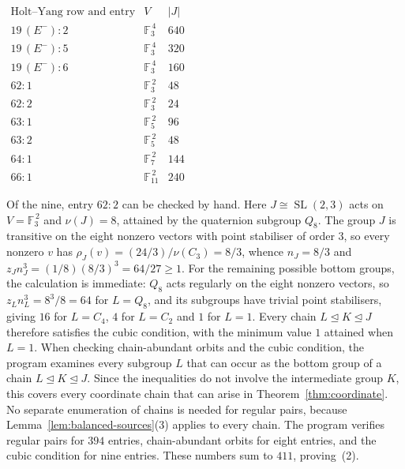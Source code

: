 \documentclass[10pt]{amsart}
\theoremstyle{definition}
\renewcommand{\ge}{\geqslant}
\let\oldendproof\endproof
\renewenvironment{proof}[1][\proofname]{%
  \oldproof[\bfseries #1]%
}{\oldendproof}
\DeclareMathOperator{\SL}{SL}
\numberwithin{equation}{section}
\numberwithin{table}{section}
\begin{document}
\begin{proof}
\begin{sloppypar}
\end{sloppypar}
\begin{table}[H]
\caption{Residual actions for which the cubic condition is used.}
\label{tab:cubic-actions}
\centering
$
\renewcommand{\arraystretch}{1.15}
\begin{array}{c|c|c}
 \text{Holt--Yang row and entry} & V & |J|\\\hline
 19\,(E^{-}):2 & \mathbb{F}_3^{\,4} & 640\\
 19\,(E^{-}):5 & \mathbb{F}_3^{\,4} & 320\\
 19\,(E^{-}):6 & \mathbb{F}_3^{\,4} & 160\\
 62:1 & \mathbb{F}_3^{\,2} & 48\\
 62:2 & \mathbb{F}_3^{\,2} & 24\\
 63:1 & \mathbb{F}_5^{\,2} & 96\\
 63:2 & \mathbb{F}_5^{\,2} & 48\\
 64:1 & \mathbb{F}_7^{\,2} & 144\\
 66:1 & \mathbb{F}_{11}^{\,2} & 240
\end{array}
$
\end{table}
Of the nine, entry $62:2$ can be checked by hand. Here
$J\cong\SL(2,3)$ acts on $V=\mathbb{F}_3^{\,2}$ and
$\nu(J)=8$, attained by the quaternion subgroup $Q_8$. The group $J$ is
transitive on the eight nonzero vectors with point stabiliser of order $3$,
so every nonzero $v$ has $\rho_J(v)=(24/3)/\nu(C_3)=8/3$, whence $n_J=8/3$
and $z_Jn_J^{3}=(1/8)(8/3)^{3}=64/27\ge1$. For the remaining possible bottom
groups, the calculation is immediate:
$Q_8$ acts regularly on the eight nonzero vectors, so $z_Ln_L^{3}=8^{3}/8=64$ for
$L=Q_8$, and its subgroups have trivial point stabilisers, giving $16$ for $L=C_4$, $4$ for
$L=C_2$ and $1$ for $L=1$. Every chain $L\trianglelefteq K\trianglelefteq J$
therefore satisfies the cubic condition, with the minimum value $1$ attained
when $L=1$.
When checking chain-abundant orbits and the cubic condition, the program
examines every subgroup $L$ that can occur as the bottom group of a chain
$L\trianglelefteq K\trianglelefteq J$. Since the inequalities do not involve
the intermediate group $K$, this covers every coordinate chain that can
arise in Theorem~\ref{thm:coordinate}. No
separate enumeration of chains is needed for regular pairs, because
Lemma~\ref{lem:balanced-sources}\textup{(3)} applies to every chain. The program
verifies regular pairs for $394$ entries, chain-abundant orbits for eight
entries, and the cubic condition for nine entries. These numbers sum to
$411$, proving~(2).
\end{proof}
\end{document}
